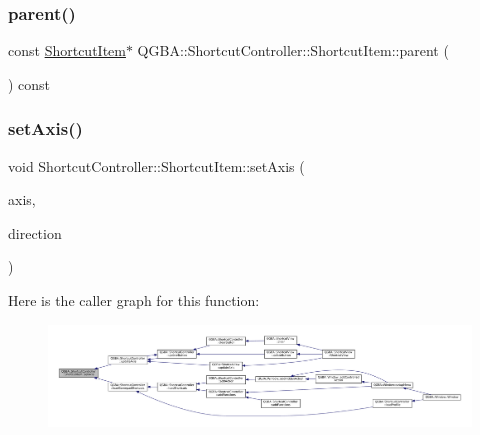 \subsubsection{\texorpdfstring{parent()}{parent()}\hspace{0.1cm}{\footnotesize\ttfamily [2/2]}}
{\footnotesize\ttfamily const \mbox{\hyperlink{class_q_g_b_a_1_1_shortcut_controller_1_1_shortcut_item}{Shortcut\+Item}}$\ast$ Q\+G\+B\+A\+::\+Shortcut\+Controller\+::\+Shortcut\+Item\+::parent (\begin{DoxyParamCaption}{ }\end{DoxyParamCaption}) const\hspace{0.3cm}{\ttfamily [inline]}}

\mbox{\label{class_q_g_b_a_1_1_shortcut_controller_1_1_shortcut_item_a8bb119af6f2c09165240f283fafccb01}} 
\subsubsection{\texorpdfstring{set\+Axis()}{setAxis()}}
{\footnotesize\ttfamily void Shortcut\+Controller\+::\+Shortcut\+Item\+::set\+Axis (\begin{DoxyParamCaption}\item[{\mbox{\hyperlink{ioapi_8h_a787fa3cf048117ba7123753c1e74fcd6}{int}}}]{axis,  }\item[{\mbox{\hyperlink{class_q_g_b_a_1_1_gamepad_axis_event_a5d50ab74dce4e58252f2affb5f227bbc}{Gamepad\+Axis\+Event\+::\+Direction}}}]{direction }\end{DoxyParamCaption})}

Here is the caller graph for this function\+:
\nopagebreak
\begin{figure}[H]
\begin{center}
\leavevmode
\includegraphics[width=350pt]{class_q_g_b_a_1_1_shortcut_controller_1_1_shortcut_item_a8bb119af6f2c09165240f283fafccb01_icgraph}
\end{center}
\end{figure}
\mbox{\label{class_q_g_b_a_1_1_shortcut_controller_1_1_shortcut_item_a8eec996b81e389387c3a16cdf88ba7c9}} 
